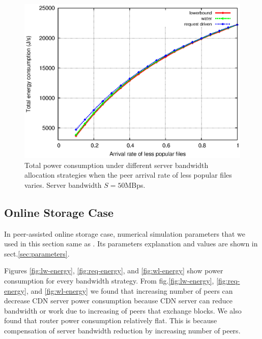 \documentclass[conference]{IEEEtran}
\begin{document}
\begin{figure}[htp!]
\hfill
\centering
\begin{minipage}[b]{0.3\linewidth}
	\includegraphics[scale=0.4]{graphs/totalconsumption.eps}
	\caption{Total power consumption under different server bandwidth allocation strategies when the peer arrival rate of less popular files varies. Server bandwidth $S=50$MBps.}
	\label{fig:totalpop}
\end{minipage}
\label{fig:popularity}
\end{figure}


\subsection{Online Storage Case}\label{subsec:onlinestorage}

In peer-assisted online storage case, numerical simulation parameters that we used in this section same as \cite{Sun:2009:POS:1542245.1542249}.
Its parameters explanation and values are shown in sect.\ref{sec:parameters}.

Figures \ref{fig:lw-energy}, \ref{fig:req-energy}, and \ref{fig:wl-energy} show power consumption for every bandwidth strategy.
From fig.\ref{fig:lw-energy}, \ref{fig:req-energy}, and \ref{fig:wl-energy} we found that increasing number of peers can decrease CDN server power consumption because CDN server can reduce bandwidth or work due to increasing of peers that exchange blocks. 
We also found that router power consumption relatively flat. 
This is because compensation of server bandwidth reduction by increasing number of peers.  

\end{document}
